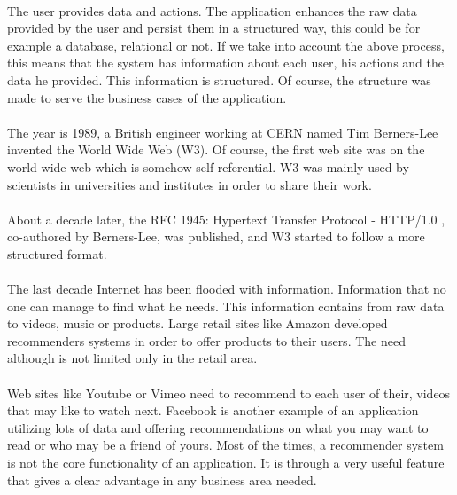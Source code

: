 \paragraph{} The user provides data and actions. The application enhances the raw data provided by the user and persist them in a structured way, this could be for example a database, relational or not. If we take into account the above process, this means that the system has information about each user, his actions and the data he provided. This information is structured. Of course, the structure was made to serve the business cases of the application.

\paragraph{} The year is 1989, a British engineer working at CERN named Tim Berners-Lee invented the World Wide Web (W3). Of course, the first web site was on the world wide web which is somehow self-referential. W3 was mainly used by scientists in universities and institutes in order to share their work. 

\paragraph{}About a decade later, the RFC 1945: Hypertext Transfer Protocol - HTTP/1.0 \cite{berners1997rfc}, co-authored by Berners-Lee, was published, and W3 started to follow a more structured format.

\paragraph{} The last decade Internet has been flooded with information. Information that no one can manage to find what he needs. This information contains from raw data to videos, music or products. Large retail sites like Amazon developed recommenders systems in order to offer products to their users. The need although is not limited only in the retail area. 
\paragraph{}Web sites like Youtube or Vimeo need to recommend to each user of their, videos that may like to watch next. Facebook is another example of an application utilizing lots of data and offering recommendations on what you may want to read or who may be a friend of yours. Most of the times, a recommender system is not the core functionality of an application. It is through a very useful feature that gives a clear advantage in any business area needed.

